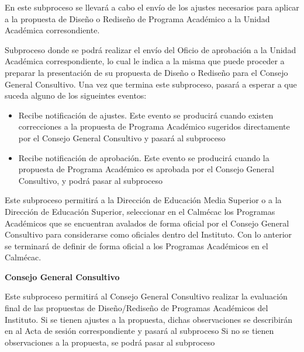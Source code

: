 \begin{PDescripcion}
\begin{enumerate}
			\Ppaso[\PSubProceso]  En este subproceso se llevará a cabo el envío de los ajustes necesarios para aplicar a la propuesta de Diseño o Rediseño de Programa Académico a la Unidad Académica corresondiente.
	
			\Ppaso[\PSubProceso]  Subproceso donde se podrá realizar el envío del Oficio de aprobación a la Unidad Académica correspondiente, lo cual le indica a la misma que puede proceder a preparar la presentación de su propuesta de Diseño o Rediseño para el Consejo General Consultivo. Una vez que termina este subproceso, pasará a esperar a que suceda alguno de los sigueintes eventos:

				\begin{itemize}
					\item Recibe notificación de ajustes. Este evento se producirá cuando existen correcciones a la propuesta de Programa Académico sugeridos directamente por el Consejo General Consultivo y pasará al subproceso 
					\item Recibe notificación de aprobación. Este evento se producirá cuando la propuesta de Programa Académico es aprobada por el Consejo General Consultivo, y podrá pasar al subproceso 
				\end{itemize}

			\Ppaso[\PSubProceso]  Este subproceso permitirá a la Dirección de Educación Media Superior o a la Dirección de Educación Superior, seleccionar en el Calmécac los Programas Académicos que se encuentran avalados de forma oficial por el Consejo General Consultivo para considerarse como oficiales dentro del Instituto. Con lo anterior se terminará de definir de forma oficial a los Programas Académicos en el Calmécac.
	
		\end{enumerate}

	\Ppaso \textbf{Consejo General Consultivo}	

		\begin{enumerate}
	
			\Ppaso[\PSubProceso]  Este subproceso permitirá al Consejo General Consultivo realizar la evaluación final de las propuestas de Diseño/Rediseño de Programas Académicos del Instituto. Si se tienen ajustes a la propuesta,  dichas observaciones se describirán en al Acta de sesión correspondiente y pasará al subproceso  Si no se tienen observaciones a la propuesta, se podrá pasar al subproceso 
	

\end{enumerate}
\end{PDescripcion}
